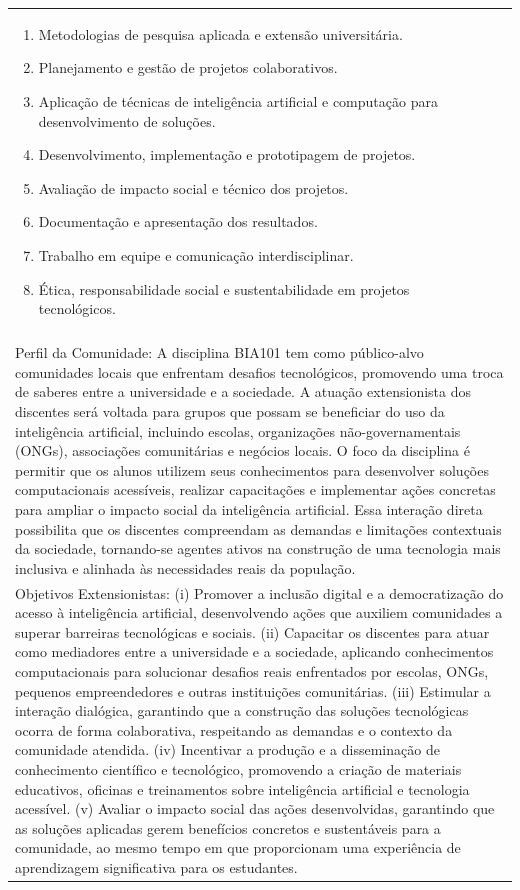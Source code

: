 \documentclass[11pt]{article}
\begin{document}
\begin{center}
\begin{longtable}{|p{4cm}|p{4cm}|p{4cm}|p{4cm}|}
{\begin{enumerate}
\item Metodologias de pesquisa aplicada e extensão universitária.
\item Planejamento e gestão de projetos colaborativos.
\item Aplicação de técnicas de inteligência artificial e computação para desenvolvimento de soluções.
\item Desenvolvimento, implementação e prototipagem de projetos.
\item Avaliação de impacto social e técnico dos projetos.
\item Documentação e apresentação dos resultados.
\item Trabalho em equipe e comunicação interdisciplinar.
\item Ética, responsabilidade social e sustentabilidade em projetos tecnológicos.\end{enumerate}}\\
\multicolumn{4}{|p{\dimexpr 16cm + 6\tabcolsep\relax}|}{}\\
\multicolumn{4}{|p{\dimexpr 16cm + 6\tabcolsep\relax}|}{Perfil da Comunidade: A disciplina BIA101 tem como público-alvo comunidades locais que enfrentam desafios tecnológicos, promovendo uma troca de saberes entre a universidade e a sociedade. A atuação extensionista dos discentes será voltada para grupos que possam se beneficiar do uso da inteligência artificial, incluindo escolas, organizações não-governamentais (ONGs), associações comunitárias e negócios locais. O foco da disciplina é permitir que os alunos utilizem seus conhecimentos para desenvolver soluções computacionais acessíveis, realizar capacitações e implementar ações concretas para ampliar o impacto social da inteligência artificial. Essa interação direta possibilita que os discentes compreendam as demandas e limitações contextuais da sociedade, tornando-se agentes ativos na construção de uma tecnologia mais inclusiva e alinhada às necessidades reais da população.}\\
\multicolumn{4}{|p{\dimexpr 16cm + 6\tabcolsep\relax}|}{Objetivos Extensionistas: (i) Promover a inclusão digital e a democratização do acesso à inteligência artificial, desenvolvendo ações que auxiliem comunidades a superar barreiras tecnológicas e sociais. (ii) Capacitar os discentes para atuar como mediadores entre a universidade e a sociedade, aplicando conhecimentos computacionais para solucionar desafios reais enfrentados por escolas, ONGs, pequenos empreendedores e outras instituições comunitárias. (iii) Estimular a interação dialógica, garantindo que a construção das soluções tecnológicas ocorra de forma colaborativa, respeitando as demandas e o contexto da comunidade atendida. (iv) Incentivar a produção e a disseminação de conhecimento científico e tecnológico, promovendo a criação de materiais educativos, oficinas e treinamentos sobre inteligência artificial e tecnologia acessível. (v) Avaliar o impacto social das ações desenvolvidas, garantindo que as soluções aplicadas gerem benefícios concretos e sustentáveis para a comunidade, ao mesmo tempo em que proporcionam uma experiência de aprendizagem significativa para os estudantes.}\\

\end{longtable}
\end{center}
\end{document}
